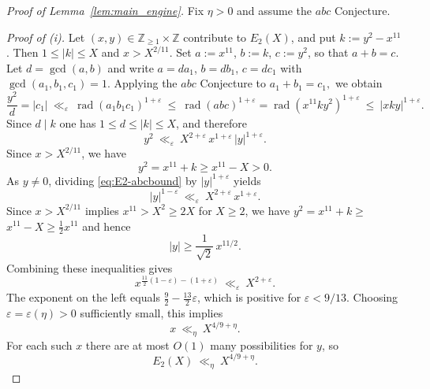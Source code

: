 \documentclass[12pt]{amsart}
\newcommand{\rad}{\operatorname{rad}}
\theoremstyle{remark}
\numberwithin{equation}{section}
\begin{document}
\begin{proof}[Proof of Lemma~\ref{lem:main_engine}]
Fix $\eta>0$ and assume the $abc$ Conjecture.

\smallskip\noindent
\emph{Proof of (i).}
Let $(x,y)\in\mathbb Z_{\ge 1}\times\mathbb Z$ contribute to $E_2(X)$, and put $k:=y^2-x^{11}$.
Then $1\le |k|\le X$ and $x>X^{2/11}$. Set $a:=x^{11}$, $b:=k$, $c:=y^2$, so that $a+b=c$.
Let $d=\gcd(a,b)$ and write $a=da_1$, $b=db_1$, $c=dc_1$ with $\gcd(a_1,b_1,c_1)=1$.
Applying the $abc$ Conjecture to $a_1+b_1=c_1,$ we obtain
\[
\frac{y^2}{d}=|c_1|\ \ll_\varepsilon\ \rad(a_1b_1c_1)^{1+\varepsilon}
\ \le\ \rad(abc)^{1+\varepsilon}
=\rad(x^{11}ky^2)^{1+\varepsilon}
\ \le\ |xky|^{1+\varepsilon}.
\]
Since $d\mid k$ one has $1\le d\le |k|\le X$, and therefore
\begin{equation}\label{eq:E2-abcbound}
y^2\ \ll_\varepsilon\ X^{2+\varepsilon}\, x^{1+\varepsilon}\, |y|^{1+\varepsilon}.
\end{equation}
Since $x>X^{2/11}$, we have
$$
y^2=x^{11}+k\geq x^{11}-X>0.
$$
As $y\neq 0$, dividing \eqref{eq:E2-abcbound} by $|y|^{1+\varepsilon}$ yields
\[
|y|^{1-\varepsilon}\ \ll_\varepsilon\ X^{2+\varepsilon}\, x^{1+\varepsilon}.
\]
Since $x>X^{2/11}$ implies $x^{11}>X^2\ge 2X$ for $X\ge 2$,
we have $ y^2 = x^{11} + k \ge $ $x^{11}-X\ge \tfrac12 x^{11}$ and hence
\[
|y|\ge \frac{1}{\sqrt2}\,x^{11/2}.
\]
Combining these inequalities gives
\[
x^{\frac{11}{2}(1-\varepsilon)-(1+\varepsilon)}\ \ll_\varepsilon\ X^{2+\varepsilon}.
\]
The exponent on the left equals $\frac92-\frac{13}{2}\varepsilon$, which is positive for $\varepsilon<9/13$.
Choosing $\varepsilon=\varepsilon(\eta)>0$ sufficiently small, this implies
\[
x\ \ll_\eta\ X^{4/9+\eta}.
\]
For each such $x$ there are at most $O(1)$ many possibilities for $y$, so
\[
E_2(X)\ \ll_\eta\ X^{4/9+\eta}.
\]


\end{proof}
\end{document}

